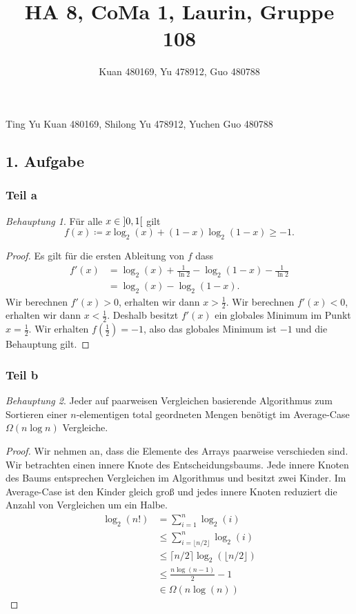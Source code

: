 \documentclass[draft,a5paper]{article}
\title{HA 8, CoMa 1, Laurin, Gruppe 108}
\author{Kuan 480169, Yu 478912, Guo 480788}
\theoremstyle{remark}
\newtheorem*{Behauptung}{Behauptung}
\begin{document}
\maketitle
\begin{center}
Ting Yu Kuan 480169, Shilong Yu 478912, Yuchen Guo 480788
\end{center}
\newpage
\subsection{1. Aufgabe}
\subsubsection{Teil a}
\begin{Behauptung}
  Für alle \(x \in \ointerval{0}{1}\) gilt
  \[f(x) \coloneq x \log_{2}(x) + (1-x)\log_{2}(1-x) \ge -1.\]
\end{Behauptung}
\begin{proof}
  Es gilt für die ersten Ableitung von \(f\) dass
  \begin{align*}
    f'(x) &= \log_{2}(x) + \frac{1}{\ln 2} - \log_{2}(1-x) -
            \frac{1}{\ln 2} \\
    &= \log_{2}(x) - \log_{2}(1-x).
  \end{align*}
  Wir berechnen \(f'(x) > 0\), erhalten wir dann \(x > \frac{1}{2}\).
  Wir berechnen \(f'(x) < 0\), erhalten wir dann \(x < \frac{1}{2}\).
  Deshalb besitzt \(f'(x)\) ein globales Minimum im Punkt \(x =
  \frac{1}{2}\).
  Wir erhalten \(f(\frac{1}{2}) = -1\), also das globales Minimum ist
  \(-1\) und die Behauptung gilt.
\end{proof}
\subsubsection{Teil b}
\begin{Behauptung}
  Jeder auf paarweisen Vergleichen basierende Algorithmus zum
  Sortieren einer \(n\)-elementigen total geordneten Mengen benötigt im
  Average-Case \(\Omega(n \log n)\) Vergleiche.
\end{Behauptung}
\begin{proof}
  Wir nehmen an, dass die Elemente des Arrays paarweise verschieden
  sind.  Wir betrachten einen innere Knote des Entscheidungsbaums.
  Jede innere Knoten des Baums entsprechen Vergleichen im Algorithmus
  und besitzt zwei Kinder.  Im Average-Case ist den Kinder gleich groß
  und jedes innere Knoten reduziert die Anzahl von Vergleichen um ein
  Halbe.
  \begin{align*}
    \log_2(n!) &= \sum_{i=1}^n \log_2(i) \\
               &\le \sum_{i = \lfloor n/2 \rfloor}^n \log_2(i) \\
               &\le \lceil n/2 \rceil \log_2(\lfloor n/2 \rfloor) \\
               &\le \frac{n \log(n-1)}{2} - 1 \\
               &\in \Omega(n\log(n))
  \end{align*}
\end{proof}
\end{document}

